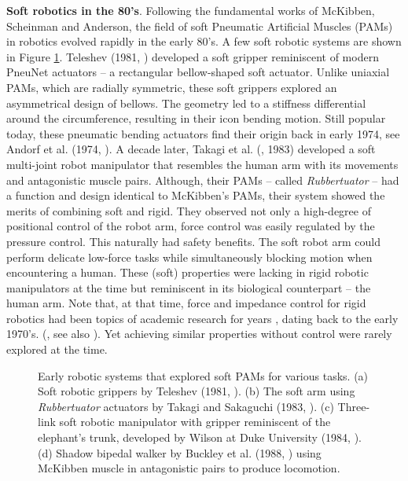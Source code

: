 \textbf{Soft robotics in the 80's}. Following the fundamental works of McKibben, Scheinman and Anderson, the field of soft Pneumatic Artificial Muscles (PAMs) in robotics evolved rapidly in the early 80's. A few soft robotic systems are shown in Figure \ref{fig:C0:earlyPAMrobots}. Teleshev (1981, \cite{Teleshev1981}) developed a soft gripper reminiscent of modern PneuNet actuators \cite{Galloway2016,Mosadegh2014,Choi2011} -- a rectangular bellow-shaped soft actuator. Unlike uniaxial PAMs, which are radially symmetric, these soft grippers explored an asymmetrical design of bellows. The geometry led to a stiffness differential around the circumference, resulting in their icon bending motion. Still popular today, these pneumatic bending actuators find their origin back in early 1974, see Andorf et al. (1974, \cite{Andorf1974}). A decade later, Takagi et al. (\cite{Takagi1983}, 1983) developed a soft multi-joint robot manipulator that resembles the human arm with its movements and antagonistic muscle pairs. Although, their PAMs -- called \textit{Rubbertuator} -- had a function and design identical to McKibben's PAMs, their system showed the merits of combining soft and rigid. They observed not only a high-degree of positional control of the robot arm, force control was easily regulated by the pressure control. This naturally had safety benefits. The soft robot arm could perform delicate low-force tasks while simultaneously blocking motion when encountering a human. These (soft) properties were lacking in rigid robotic manipulators at the time but reminiscent in its biological counterpart -- the human arm. Note that, at that time, force and impedance control for rigid robotics had been topics of academic research for years \cite{Anderson1988,Khatib1987,Hogan1984,Hogan1984Jan}, dating back to the early 1970's. (\eg, see also \cite{Markiewicz1973}). Yet achieving similar properties without control were rarely explored at the time.
%
\begin{figure}[!t]
  \vspace{-2mm}
  \ifx\printFigures\undefined
  \else
  \hspace{1mm}
  
  \fi
  \caption{Early robotic systems that explored soft PAMs for various tasks. (a) Soft robotic grippers by Teleshev (1981, \cite{Teleshev1981}). (b) The soft arm using \textit{Rubbertuator} actuators by Takagi and Sakaguchi (1983, \cite{Takagi1983}). (c) Three-link soft robotic manipulator with gripper reminiscent of the elephant's trunk, developed by Wilson at Duke University (1984, \cite{Wilson2007,Weisburd1988}). (d) Shadow bipedal walker by Buckley et al. (1988, \cite{Buckley2012}) using McKibben muscle in antagonistic pairs to produce locomotion.
  \label{fig:C0:earlyPAMrobots}}
  \vspace{-2mm}
\end{figure}

